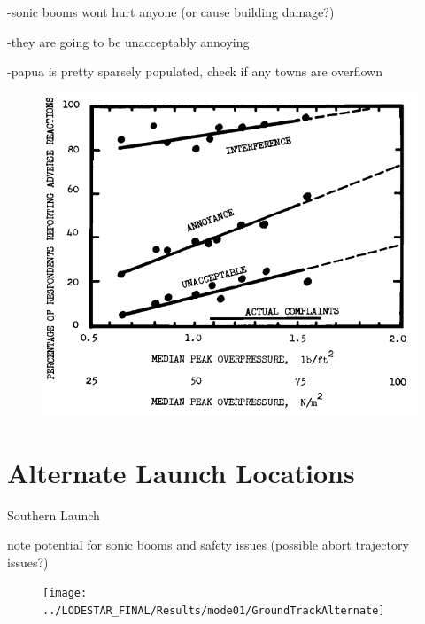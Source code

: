 -sonic booms wont hurt anyone (or cause building damage?)

-they are going to be unacceptably annoying

-papua is pretty sparsely populated, check if any towns are overflown


\begin{figure}[ht]
\centering
\includegraphics[width=0.6\linewidth]{figures/6_FlyBack/OverPressureResponse}
\caption{}
\label{fig:OverPressureResponse}
\end{figure}


\section{Alternate Launch Locations}

Southern Launch

note potential for sonic booms and safety issues (possible abort trajectory issues?)

\begin{figure}[th]
\centering
\texttt{[image: ../LODESTAR\_FINAL/Results/mode01/GroundTrackAlternate]}
\caption{}
\label{fig:GroundTrackAlternate}
\end{figure}

